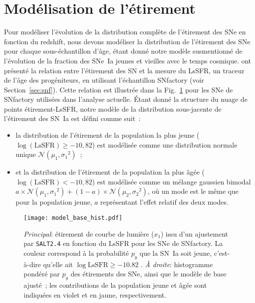 \documentclass[../main/main.tex]{subfiles}
\begin{document}
\newpage

\section{Modélisation de l'étirement}\label{sec:xmod}

Pour modéliser l'évolution de la distribution complète de l'étirement des SNe en
fonction du redshift, nous devons modéliser la distribution de l'étirement des
SNe pour chaque sous-échantillon d'âge, étant donné notre modèle susmentionné de
l'évolution de la fraction des SNe~Ia jeunes et vieilles avec le temps cosmique.
\cite{rigault2020} ont présenté la relation entre l'étirement des SN et la
mesure du LsSFR, un traceur de l'âge des progéniteurs, en utilisant
l'échantillon SNfactory (voir Section~\ref{sec:snf}). Cette relation est
illustrée dans la Fig.~\ref{fig:stretchlssfr} pour les SNe de SNfactory
utilisées dans l'analyse actuelle. Étant donné la structure du nuage de points
étirement-LsSFR, notre modèle de la distribution sous-jacente de l'étirement des
SN~Ia est défini comme suit~:
\begin{itemize}
    \item la distribution de l'étirement de la population la plus jeune
        ($\log(\mathrm{LsSFR})\geq-10,82$) est modélisée comme une distribution
        normale unique $\mathcal{N}(\mu_1, \sigma_1{}^2)$~;
    \item et la distribution de l'étirement de la population la plus âgée
        ($\log(\mathrm{LsSFR})<-10,82$) est modélisée comme un mélange gaussien
        bimodal $a\times \mathcal{N} (\mu_1, \sigma_1{}^2) + (1-a)\times
        \mathcal{N}(\mu_2, \sigma_2{}^2)$, où un mode est le même que pour la
        population jeune, $a$ représentant l'effet relatif des deux modes.
\end{itemize}

\begin{figure}
    \centering
    \texttt{[image: model\_base\_hist.pdf]}
    \caption[Étirement en fonction du LsSFR des SNe~Ia de SNfactory et modèles
    d'étirement de base ajustés]{\textit{Principal}: étirement de courbe de
        lumière ($x_1$) issu d'un ajustement par \textsc{\texttt{SALT2.4}} en
        fonction du LsSFR pour les SNe de SNfactory. La couleur correspond à la
        probabilité $p_y$ que la SN~Ia soit jeune, c'est-à-dire qu'elle ait
        $\log\mathrm{LsSFR} \geq -10.82$ \citep[voir][]{rigault2020}. \textit{À
        droite}: histogramme pondéré par $p_y$ des étirements des SNe, ainsi que
        le modèle de base ajusté~; les contributions de la population jeune
    et âgée sont indiquées en violet et en jaune, respectivement.}
    \label{fig:stretchlssfr}
\end{figure}
\end{document}
